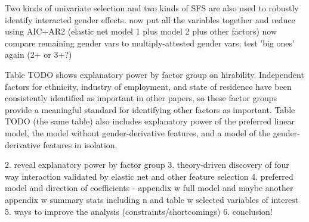 \documentclass[review]{elsarticle}
\begin{document}
Two kinds of univariate selection and two kinds of SFS are also used to robustly identify interacted gender effects.
now put all the variables together and reduce using AIC+AR2 (elastic net model 1 plus model 2 plus other factors)
now compare remaining gender vars to multiply-attested gender vars; test 'big ones' again (2+ or 3+?)







Table TODO shows explanatory power by factor group on hirability.
Independent factors for ethnicity, industry of employment, and state of residence
have been consistently identified as important in other papers,
so these factor groups provide a meaningful standard for identifying other factors as important.
Table TODO (the same table) also includes explanatory power of the preferred linear model,
the model without gender-derivative features,
and a model of the gender-derivative features in isolation.





2. reveal explanatory power by factor group
3. theory-driven discovery of four way interaction validated by elastic net and other feature selection
4. preferred model and direction of coefficients - appendix w full model and maybe another appendix w summary stats including n and table w selected variables of interest
5. ways to improve the analysis (constraints/shortcomings)
6. conclusion!

\end{document}
